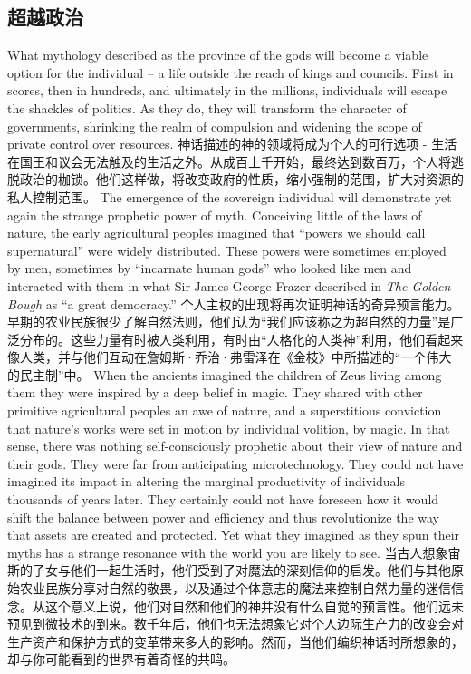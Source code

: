 \subsection{超越政治}
\begin{paracol}{2}[]
What mythology described as the province of the gods will become a viable option for the individual -- a life outside the reach of kings and councils. First in scores, then in hundreds, and ultimately in the millions, individuals will escape the shackles of politics. As they do, they will transform the character of governments, shrinking the realm of compulsion and widening the scope of private control over resources.
\switchcolumn
神话描述的神的领域将成为个人的可行选项 - 生活在国王和议会无法触及的生活之外。从成百上千开始，最终达到数百万，个人将逃脱政治的枷锁。他们这样做，将改变政府的性质，缩小强制的范围，扩大对资源的私人控制范围。
\switchcolumn*
The emergence of the sovereign individual will demonstrate yet again the strange prophetic power of myth. Conceiving little of the laws of nature, the early agricultural peoples imagined that ``powers we should call supernatural'' were widely distributed. These powers were sometimes employed by men, sometimes by ``incarnate human gods'' who looked like men and interacted with them in what Sir James George Frazer described in \emph{The Golden Bough} as ``a great democracy.''
\switchcolumn
个人主权的出现将再次证明神话的奇异预言能力。早期的农业民族很少了解自然法则，他们认为“我们应该称之为超自然的力量”是广泛分布的。这些力量有时被人类利用，有时由“人格化的人类神”利用，他们看起来像人类，并与他们互动在詹姆斯·乔治·弗雷泽在《金枝》中所描述的“一个伟大的民主制”中。
\switchcolumn*
When the ancients imagined the children of Zeus living among them they were inspired by a deep belief in magic. They shared with other primitive agricultural peoples an awe of nature, and a superstitious conviction that nature's works were set in motion by individual volition, by magic. In that sense, there was nothing self-consciously prophetic about their view of nature and their gods. They were far from anticipating microtechnology. They could not have imagined its impact in altering the marginal productivity of individuals thousands of years later. They certainly could not have foreseen how it would shift the balance between power and efficiency and thus revolutionize the way that assets are created and protected. Yet what they imagined as they spun their myths has a strange resonance with the world you are likely to see.
\switchcolumn
当古人想象宙斯的子女与他们一起生活时，他们受到了对魔法的深刻信仰的启发。他们与其他原始农业民族分享对自然的敬畏，以及通过个体意志的魔法来控制自然力量的迷信信念。从这个意义上说，他们对自然和他们的神并没有什么自觉的预言性。他们远未预见到微技术的到来。数千年后，他们也无法想象它对个人边际生产力的改变会对生产资产和保护方式的变革带来多大的影响。然而，当他们编织神话时所想象的，却与你可能看到的世界有着奇怪的共鸣。
\end{paracol}

